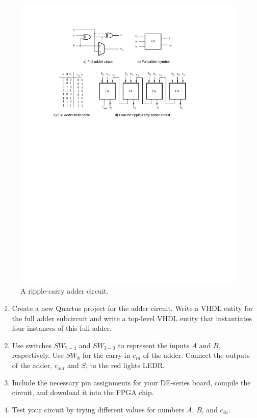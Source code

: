 \documentclass[epsfig,10pt,fullpage]{article}
\begin{document}
\begin{figure}[H]
	\begin{center}
		\includegraphics[]{figures/figure2.pdf}
	\end{center}
\caption{A ripple-carry adder circuit.}
\label{fig:fig2}
\end{figure}

\begin{enumerate}
\item Create a new Quartus project for the adder circuit. Write a VHDL entity
for the full adder subcircuit and write a top-level VHDL entity that instantiates four 
instances of this full adder.
\item Use switches $SW_{7-4}$ and $SW_{3-0}$ to represent the inputs $A$ and $B$, respectively.
Use $SW_{8}$ for the carry-in $c_{in}$ of the adder. Connect the outputs of the adder, 
$c_{out}$ and $S$, to the red lights LEDR.
\item Include the necessary pin assignments for your DE-series board, compile the circuit, and
download it into the FPGA chip.
\item Test your circuit by trying different values for numbers $A$, $B$, and $c_{in}$.
\end{enumerate}
\end{document}
